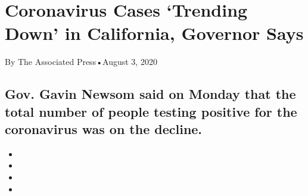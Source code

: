 \hypertarget{coronavirus-cases-trending-down-in-california-governor-says-1}{%
\section{Coronavirus Cases `Trending Down' in California, Governor
Says}\label{coronavirus-cases-trending-down-in-california-governor-says-1}}

By The Associated Press•August 3, 2020

\hypertarget{gov-gavin-newsom-said-on-monday-that-the-total-number-of-people-testing-positive-for-the-coronavirus-was-on-the-decline-1}{%
\subsection{Gov. Gavin Newsom said on Monday that the total number of
people testing positive for the coronavirus was on the
decline.}\label{gov-gavin-newsom-said-on-monday-that-the-total-number-of-people-testing-positive-for-the-coronavirus-was-on-the-decline-1}}

\begin{itemize}
\item
\item
\item
\item
\end{itemize}

